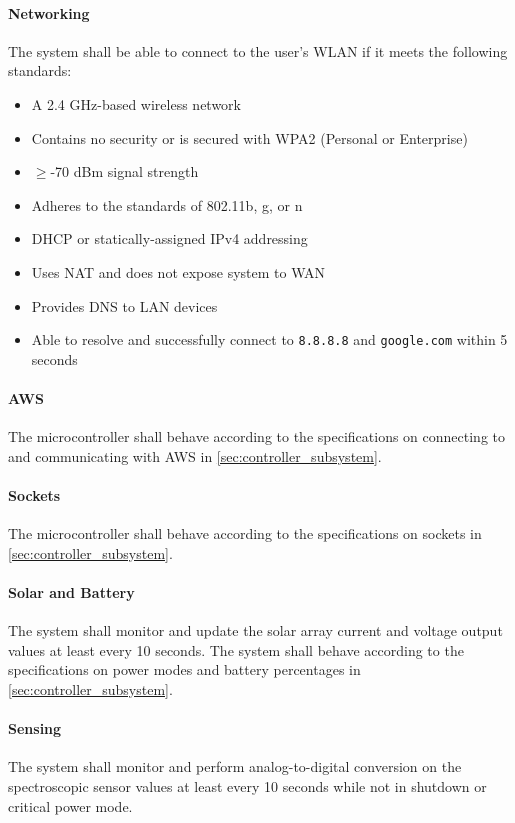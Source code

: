 \paragraph{Networking} The system shall be able to connect to the user's WLAN if it meets the following standards:
\begin{itemize}
    \item A 2.4 GHz-based wireless network
    \item Contains no security or is secured with WPA2 (Personal or Enterprise)
    \item $\geq$-70 dBm signal strength
    \item Adheres to the standards of 802.11b, g, or n
    \item DHCP or statically-assigned IPv4 addressing
    \item Uses NAT and does not expose system to WAN
    \item Provides DNS to LAN devices
    \item Able to resolve and successfully connect to \texttt{8.8.8.8} and \texttt{google.com} within 5 seconds
\end{itemize}

\paragraph{AWS} The microcontroller shall behave according to the specifications on connecting to and communicating with AWS in \autoref{sec:controller_subsystem}.

\paragraph{Sockets} The microcontroller shall behave according to the specifications on sockets in \autoref{sec:controller_subsystem}.

\paragraph{Solar and Battery} The system shall monitor and update the solar array current and voltage output values at least every 10 seconds. The system shall behave according to the specifications on power modes and battery percentages in \autoref{sec:controller_subsystem}.

\paragraph{Sensing} The system shall monitor and perform analog-to-digital conversion on the spectroscopic sensor values at least every 10 seconds while not in shutdown or critical power mode.
